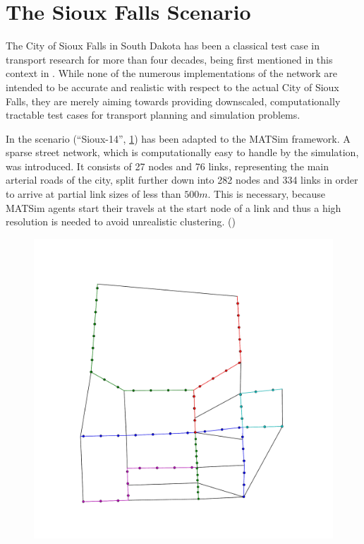 \section{The Sioux Falls Scenario}
\label{sec:sioux}

The City of Sioux Falls in South Dakota has been a classical test case in transport
research for more than four decades, being first mentioned in this context in
\citet{Morlok1973}. While none of the numerous implementations of the network are intended to be accurate
and realistic with respect to the actual City of Sioux Falls, they are merely aiming
towards providing downscaled, computationally tractable test cases for transport
planning and simulation problems.

In \citet{Chakirov2014} the scenario (``Sioux-14'', \cref{fig:sioux14}) has been
adapted to the MATSim framework. A sparse street network, which is computationally
easy to handle by the simulation, was introduced. It consists of 27 nodes and 76 links,
representing the main arterial roads of the city, split further down into
282 nodes and 334 links in order to arrive at partial link sizes of less than $500m$.
This is necessary, because MATSim agents start their travels at the start node
of a link and thus a high resolution is needed to avoid unrealistic clustering.
()

\begin{figure}
    \centering
    \includegraphics[width=\textwidth]{figures/sioux14_pt.pdf}
    \caption{}
    \label{fig:sioux14}
\end{figure}

